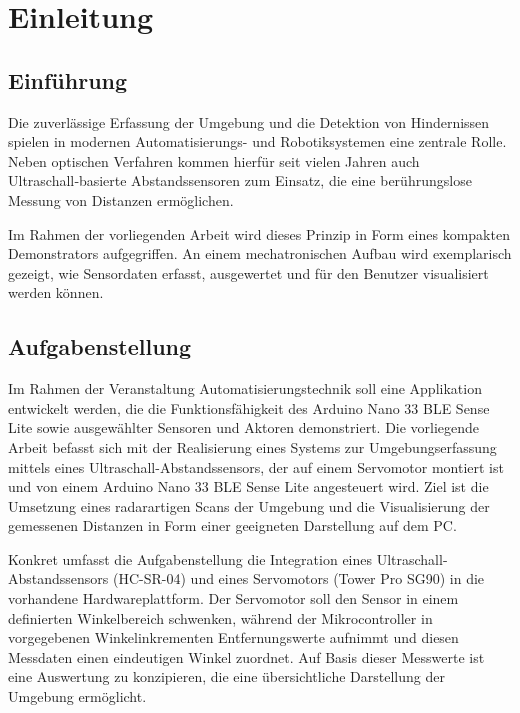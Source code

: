 %
%
%

\part{Einleitung} 

\chapter{Einführung}

	Die zuverlässige Erfassung der Umgebung und die Detektion von Hindernissen
	spielen in modernen Automatisierungs- und Robotiksystemen eine zentrale Rolle.
	Neben optischen Verfahren kommen hierfür seit vielen Jahren auch
	Ultraschall‑basierte Abstandssensoren zum Einsatz, die eine berührungslose
	Messung von Distanzen ermöglichen.
	
	Im Rahmen der vorliegenden Arbeit wird dieses Prinzip in Form eines
	kompakten Demonstrators aufgegriffen. An einem mechatronischen Aufbau
	wird exemplarisch gezeigt, wie Sensordaten erfasst, ausgewertet und für
	den Benutzer visualisiert werden können.

\chapter{Aufgabenstellung}

	Im Rahmen der Veranstaltung Automatisierungstechnik soll eine Applikation entwickelt werden, die die Funktionsfähigkeit des Arduino Nano 33 BLE Sense Lite sowie ausgewählter Sensoren und Aktoren demonstriert. Die vorliegende Arbeit befasst sich mit der Realisierung eines Systems zur Umgebungserfassung mittels eines Ultraschall-Abstandssensors, der auf einem Servomotor montiert ist und von einem Arduino Nano 33 BLE Sense Lite angesteuert wird. Ziel ist die Umsetzung eines radarartigen Scans der Umgebung und die Visualisierung der gemessenen Distanzen in Form einer geeigneten Darstellung auf dem PC.
	
	Konkret umfasst die Aufgabenstellung die Integration eines Ultraschall-Abstandssensors (HC-SR-04) und eines Servomotors (Tower Pro SG90) in die vorhandene Hardwareplattform. Der Servomotor soll den Sensor in einem definierten Winkelbereich schwenken, während der Mikrocontroller in vorgegebenen Winkelinkrementen Entfernungswerte aufnimmt und diesen Messdaten einen eindeutigen Winkel zuordnet. Auf Basis dieser Messwerte ist eine Auswertung zu konzipieren, die eine übersichtliche Darstellung der Umgebung ermöglicht.
	
